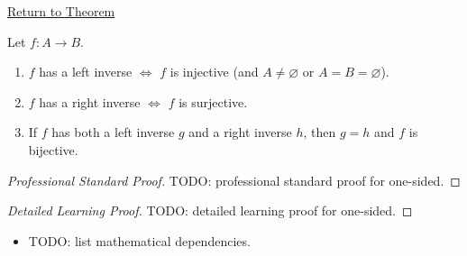\newpage
{}
\label{prf:one-sided}

\begin{remark*}[Return]
\hyperref[thm:one-sided]{Return to Theorem}
\end{remark*}

\begin{theorem*}
Let $f : A \to B$.
\begin{enumerate}[label=(\roman*)]
\item $f$ has a left inverse $\iff$ $f$ is injective (and $A \neq \varnothing$ or $A=B=\varnothing$).
\item $f$ has a right inverse $\iff$ $f$ is surjective.
\item If $f$ has both a left inverse $g$ and a right inverse $h$, then $g = h$
and $f$ is bijective.
\end{enumerate}
\end{theorem*}

\begin{proof}[Professional Standard Proof]
\LRAProofBodyStart
TODO: professional standard proof for one-sided.
\end{proof}

\begin{proof}[Detailed Learning Proof]
\LRAProofBodyStart
TODO: detailed learning proof for one-sided.
\end{proof}

\begin{remark*}
\end{remark*}

\begin{dependencies}
\begin{itemize}
  \item TODO: list mathematical dependencies.
\end{itemize}
\end{dependencies}

\clearpage
